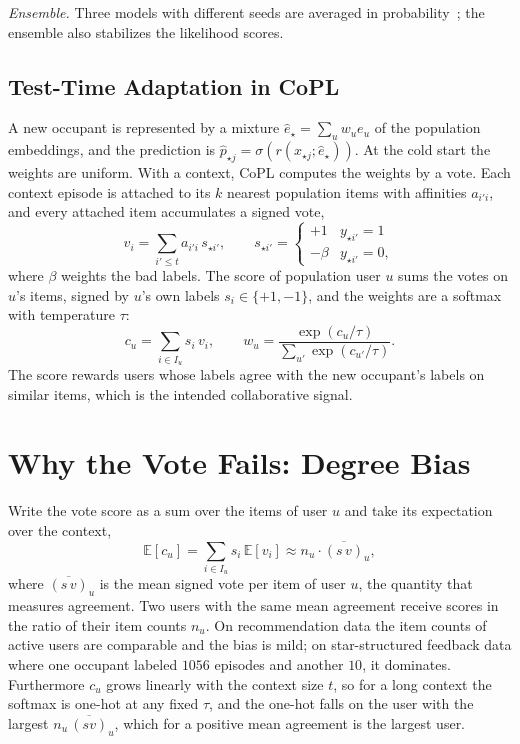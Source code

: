 \documentclass[conference]{IEEEtran}
\newcommand{\E}{\mathbb{E}}
\newcommand{\sigmoid}{\sigma}
\newcommand{\newuser}{\star}
\begin{document}
\emph{Ensemble.} Three models with different seeds are averaged in probability~\cite{lakshminarayanan2017ensembles}; the ensemble also stabilizes the likelihood scores.

\subsection{Test-Time Adaptation in CoPL}
\label{sec:copl-adapt}

A new occupant is represented by a mixture $\hat e_\newuser=\sum_u w_ue_u$ of the population embeddings, and the prediction is $\hat p_{\newuser j}=\sigmoid(r(x_{\newuser j};\hat e_\newuser))$. At the cold start the weights are uniform. With a context, CoPL computes the weights by a vote. Each context episode is attached to its $k$ nearest population items with affinities $a_{i'i}$, and every attached item accumulates a signed vote,
\begin{equation}
 v_i=\sum_{i'\le t}a_{i'i}\,s_{\newuser i'},\qquad s_{\newuser i'}=\begin{cases}+1 & y_{\newuser i'}=1\\ -\beta & y_{\newuser i'}=0,\end{cases}
 \label{eq:vote-items}
\end{equation}
where $\beta$ weights the bad labels. The score of population user $u$ sums the votes on $u$'s items, signed by $u$'s own labels $s_i\in\{+1,-1\}$, and the weights are a softmax with temperature $\tau$:
\begin{equation}
 c_u=\sum_{i\in I_u}s_i\,v_i,\qquad w_u=\frac{\exp(c_u/\tau)}{\sum_{u'}\exp(c_{u'}/\tau)}.
 \label{eq:vote-users}
\end{equation}
The score rewards users whose labels agree with the new occupant's labels on similar items, which is the intended collaborative signal.

\section{Why the Vote Fails: Degree Bias}
\label{sec:vote}

Write the vote score as a sum over the items of user $u$ and take its expectation over the context,
\begin{equation}
 \E[c_u]=\sum_{i\in I_u}s_i\,\E[v_i]\approx n_u\cdot\overline{(s\,v)}_u,
 \label{eq:degree}
\end{equation}
where $\overline{(s\,v)}_u$ is the mean signed vote per item of user $u$, the quantity that measures agreement. Two users with the same mean agreement receive scores in the ratio of their item counts $n_u$. On recommendation data the item counts of active users are comparable and the bias is mild; on star-structured feedback data where one occupant labeled $1056$ episodes and another $10$, it dominates. Furthermore $c_u$ grows linearly with the context size $t$, so for a long context the softmax is one-hot at any fixed $\tau$, and the one-hot falls on the user with the largest $n_u\,\overline{(sv)}_u$, which for a positive mean agreement is the largest user.
\end{document}
